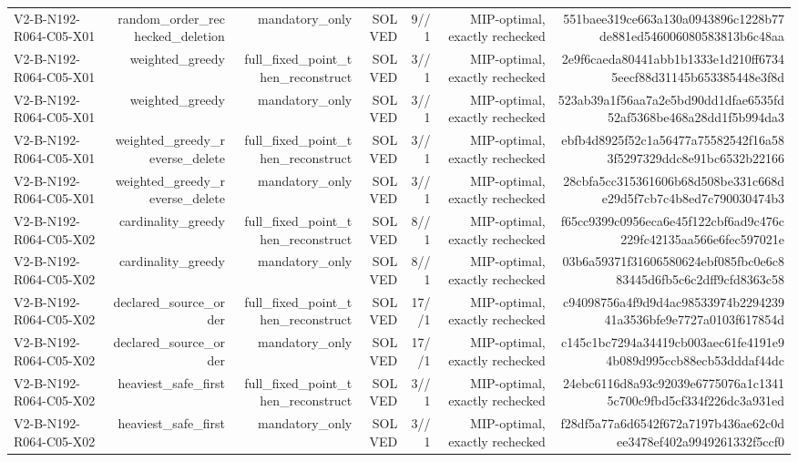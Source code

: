 {\begin{longtable}{lrrrrrr}
V2-B-N192-R064-C05-X01 & random\_order\_rechecked\_deletion & mandatory\_only & SOLVED & 9//1 & MIP-optimal, exactly rechecked & 551baee319ce663a130a0943896c1228b77de881ed546006080583813b6c48aa \\
V2-B-N192-R064-C05-X01 & weighted\_greedy & full\_fixed\_point\_then\_reconstruct & SOLVED & 3//1 & MIP-optimal, exactly rechecked & 2e9f6caeda80441abb1b1333e1d210ff67345eecf88d31145b653385448e3f8d \\
V2-B-N192-R064-C05-X01 & weighted\_greedy & mandatory\_only & SOLVED & 3//1 & MIP-optimal, exactly rechecked & 523ab39a1f56aa7a2e5bd90dd1dfae6535fd52af5368be468a28dd1f5b994da3 \\
V2-B-N192-R064-C05-X01 & weighted\_greedy\_reverse\_delete & full\_fixed\_point\_then\_reconstruct & SOLVED & 3//1 & MIP-optimal, exactly rechecked & ebfb4d8925f52c1a56477a75582542f16a583f5297329ddc8e91bc6532b22166 \\
V2-B-N192-R064-C05-X01 & weighted\_greedy\_reverse\_delete & mandatory\_only & SOLVED & 3//1 & MIP-optimal, exactly rechecked & 28cbfa5cc315361606b68d508be331c668de29d5f7cb7c4b8ed7c790030474b3 \\
V2-B-N192-R064-C05-X02 & cardinality\_greedy & full\_fixed\_point\_then\_reconstruct & SOLVED & 8//1 & MIP-optimal, exactly rechecked & f65cc9399c0956eca6e45f122cbf6ad9c476c229fc42135aa566e6fec597021e \\
V2-B-N192-R064-C05-X02 & cardinality\_greedy & mandatory\_only & SOLVED & 8//1 & MIP-optimal, exactly rechecked & 03b6a59371f31606580624ebf085fbc0e6c883445d6fb5c6c2dff9cfd8363c58 \\
V2-B-N192-R064-C05-X02 & declared\_source\_order & full\_fixed\_point\_then\_reconstruct & SOLVED & 17//1 & MIP-optimal, exactly rechecked & c94098756a4f9d9d4ac98533974b229423941a3536bfe9e7727a0103f617854d \\
V2-B-N192-R064-C05-X02 & declared\_source\_order & mandatory\_only & SOLVED & 17//1 & MIP-optimal, exactly rechecked & c145c1bc7294a34419cb003aec61fe4191e94b089d995ccb88ecb53dddaf44dc \\
V2-B-N192-R064-C05-X02 & heaviest\_safe\_first & full\_fixed\_point\_then\_reconstruct & SOLVED & 3//1 & MIP-optimal, exactly rechecked & 24ebc6116d8a93c92039e6775076a1c13415c700c9fbd5cf334f226dc3a931ed \\
V2-B-N192-R064-C05-X02 & heaviest\_safe\_first & mandatory\_only & SOLVED & 3//1 & MIP-optimal, exactly rechecked & f28df5a77a6d6542f672a7197b436ae62c0dee3478ef402a9949261332f5ccf0 \\

\end{longtable}}
